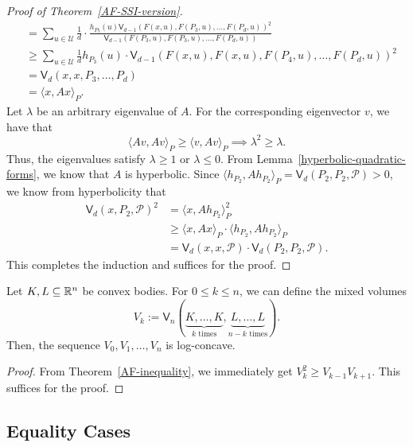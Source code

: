 \documentclass{puthesis-UG}
\begin{document}
\begin{proof}[Proof of Theorem~\ref{AF-SSI-version}]
\begin{align*}
		& = \sum_{u \in \mathcal{U}} \frac{1}{d} \cdot \frac{h_{P_3}(u) \mathsf{V}_{d-1}(F(x, u), F(P_3, u), \ldots, F(P_d, u))^2}{\mathsf{V}_{d-1}(F(P_3, u), F(P_3, u), \ldots, F(P_d, u))} \\
		& \geq \sum_{u \in \mathcal{U}} \frac{1}{d} h_{P_3}(u) \cdot \mathsf{V}_{d-1} (F(x, u), F(x, u), F(P_4, u), \ldots, F(P_d, u))^2 \\
		& = \mathsf{V}_d (x, x, P_3, \ldots, P_d) \\
		& = \langle x, Ax \rangle_P.
	\end{align*}
	Let $\lambda$ be an arbitrary eigenvalue of $A$. For the corresponding eigenvector $v$, we have that 
	\[
		\langle Av, Av \rangle_P \geq \langle v, Av \rangle_P \implies \lambda^2 \geq \lambda. 
	\]
	Thus, the eigenvalues satisfy $\lambda \geq 1$ or $\lambda \leq 0$. From Lemma~\ref{hyperbolic-quadratic-forms}, we know that $A$ is hyperbolic. Since $\langle h_{P_2}, A h_{P_2} \rangle_P = \mathsf{V}_d (P_2, P_2, \mathcal{P}) > 0$, we know from hyperbolicity that 
	\begin{align*}
		\mathsf{V}_d (x, P_2, \mathcal{P})^2 & = \langle x, A h_{P_2} \rangle_P^2 \\
		& \geq \langle x, Ax \rangle_P \cdot \langle h_{P_2}, Ah_{P_2} \rangle_P \\
		& = \mathsf{V}_d(x, x, \mathcal{P}) \cdot \mathsf{V}_d (P_2, P_2, \mathcal{P}).
	\end{align*}
	This completes the induction and suffices for the proof. 
\end{proof}



\begin{cor} \label{AF-log-concavity}
	Let $K, L \subseteq \mathbb{R}^n$ be convex bodies. For $0 \leq k \leq n$, we can define the mixed volumes
	\[
		V_k := \mathsf{V}_n (\underbrace{K, \ldots, K}_{k \text{ times}}, \underbrace{L, \dots, L}_{n-k \text{ times}}).
	\]
	Then, the sequence $V_0, V_1, \ldots, V_n$ is log-concave. 
\end{cor}

\begin{proof}
	From Theorem~\ref{AF-inequality}, we immediately get $V_k^2 \geq V_{k-1}V_{k+1}$. This suffices for the proof. 
\end{proof}



\subsection{Equality Cases}
\end{document}
